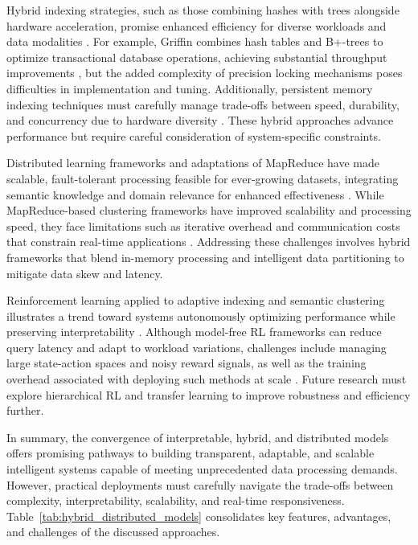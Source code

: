 \documentclass[sigconf]{acmart}
\begin{document}
Hybrid indexing strategies, such as those combining hashes with trees alongside hardware acceleration, promise enhanced efficiency for diverse workloads and data modalities \cite{ref35,ref27}. For example, Griffin combines hash tables and B+-trees to optimize transactional database operations, achieving substantial throughput improvements \cite{ref35}, but the added complexity of precision locking mechanisms poses difficulties in implementation and tuning. Additionally, persistent memory indexing techniques must carefully manage trade-offs between speed, durability, and concurrency due to hardware diversity \cite{ref27}. These hybrid approaches advance performance but require careful consideration of system-specific constraints.

Distributed learning frameworks and adaptations of MapReduce have made scalable, fault-tolerant processing feasible for ever-growing datasets, integrating semantic knowledge and domain relevance for enhanced effectiveness \cite{ref18,ref17}. While MapReduce-based clustering frameworks have improved scalability and processing speed, they face limitations such as iterative overhead and communication costs that constrain real-time applications \cite{ref16}. Addressing these challenges involves hybrid frameworks that blend in-memory processing and intelligent data partitioning to mitigate data skew and latency.

Reinforcement learning applied to adaptive indexing and semantic clustering illustrates a trend toward systems autonomously optimizing performance while preserving interpretability \cite{ref33,ref16}. Although model-free RL frameworks can reduce query latency and adapt to workload variations, challenges include managing large state-action spaces and noisy reward signals, as well as the training overhead associated with deploying such methods at scale \cite{ref33}. Future research must explore hierarchical RL and transfer learning to improve robustness and efficiency further.

In summary, the convergence of interpretable, hybrid, and distributed models offers promising pathways to building transparent, adaptable, and scalable intelligent systems capable of meeting unprecedented data processing demands. However, practical deployments must carefully navigate the trade-offs between complexity, interpretability, scalability, and real-time responsiveness. Table~\ref{tab:hybrid_distributed_models} consolidates key features, advantages, and challenges of the discussed approaches.
\end{document}
